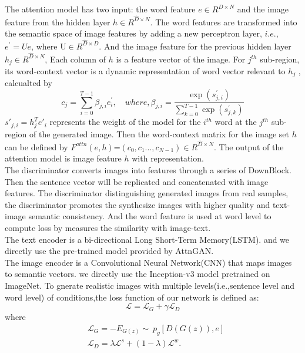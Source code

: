 \documentclass[runningheads, orivec]{llncs}
\begin{document}
The attention model has two input: the word feature $e\in {R} ^{D \times{N}}$ and the image feature from the hidden layer $h\in {R} ^{\hat{D} \times{N}}$. The word features are transformed  into the semantic space of image features by adding a new perceptron layer, $i.e.$, $e^{\prime}=Ue$, where $\mathrm{U}\in {R} ^{\hat{D} \times{D}}$. And the image feature for the previous hidden layer $h_j\in {R} ^{\hat{D} \times{N}}$, Each column of $h$ is a feature vector of the image.  For $j^{th}$ sub-region, its word-context vector is a dynamic representation of word vector relevant to $h_j$ , calcualted by 
\begin{equation}
c_{j}=\sum_{i=0}^{T-1} \beta_{j, i} e_i^{\prime}, 
\quad where,
\beta_{j,i}=\frac{\exp \left(s_{j,i}^{\prime}\right)}{\sum_{k=0}^{T-1} \exp \left(s_{j, k}^{\prime}\right)}
\end{equation}
${s}'_{j,i}=h^{T}_{j}{e}'_{i}$ represents the weight of the model for the $i^{th}$ word at the $j^{th}$ sub-region of the generated image. Then the word-context matrix for the image set $h$ can be defined by $F^{attn}(e,h)$=$(c_{0},c_{1}...,c_{N-1})\in R^{\hat{D}\times N}$. The output of the attention model is image feature $h$ with representation.\\
The discriminator converts images into features through a series of DownBlock. Then the sentence vector will be replicated and concatenated with image features. The discriminator distinguishing generated images from real samples, the discriminator promotes the synthesize images with higher quality and text-image semantic consistency. And the word feature is used at word level to compute loss by measures the similarity with image-text.\\
The text encoder is a bi-directional Long Short-Term Memory(LSTM). and we directly use the pre-trained model provided by AttnGAN.\\
The image encoder is a Convolutional Neural Network(CNN) that maps images to semantic vectors. we directly use the Inception-v3 model pretrained on ImageNet.
To gnerate realistic images with multiple levels(i.e.,sentence level and word level) of conditions,the loss function of our network is defined as:
\begin{equation}
    \mathcal{L} =\mathcal{L} _{G}+ \gamma \mathcal{L} _{D}
\end{equation}
where
\begin{equation}
\begin{aligned}
        &\mathcal{L} _{G} = -E_{G(z)}\sim\ p_{g}[D(G(z)),e]\\
        &\mathcal{L}_{D} = \lambda \mathcal{L}^{s}+(1-\lambda) \mathcal{L}^{w}.
\end{aligned}
\end{equation}
\end{document}
